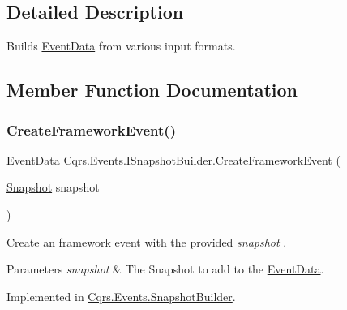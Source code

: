 \subsection{Detailed Description}
Builds \hyperlink{classCqrs_1_1Events_1_1EventData}{Event\+Data} from various input formats. 



\subsection{Member Function Documentation}
\mbox{\label{interfaceCqrs_1_1Events_1_1ISnapshotBuilder_afb318f1c84773084414b907e75c4aa0a_afb318f1c84773084414b907e75c4aa0a}} 
\subsubsection{\texorpdfstring{Create\+Framework\+Event()}{CreateFrameworkEvent()}\hspace{0.1cm}{\footnotesize\ttfamily [1/2]}}
{\footnotesize\ttfamily \hyperlink{classCqrs_1_1Events_1_1EventData}{Event\+Data} Cqrs.\+Events.\+I\+Snapshot\+Builder.\+Create\+Framework\+Event (\begin{DoxyParamCaption}\item[{\hyperlink{classCqrs_1_1Snapshots_1_1Snapshot}{Snapshot}}]{snapshot }\end{DoxyParamCaption})}



Create an \hyperlink{}{framework event} with the provided {\itshape snapshot} . 


\begin{DoxyParams}{Parameters}
{\em snapshot} & The Snapshot to add to the \hyperlink{classCqrs_1_1Events_1_1EventData}{Event\+Data}.\\
\hline
\end{DoxyParams}


Implemented in \hyperlink{classCqrs_1_1Events_1_1SnapshotBuilder_ae6c7cd51ef132fb9a2cc951753b453c3_ae6c7cd51ef132fb9a2cc951753b453c3}{Cqrs.\+Events.\+Snapshot\+Builder}.

\mbox{\label{interfaceCqrs_1_1Events_1_1ISnapshotBuilder_a2f06f7a8f0995aabb90a0e8152271426_a2f06f7a8f0995aabb90a0e8152271426}} 
